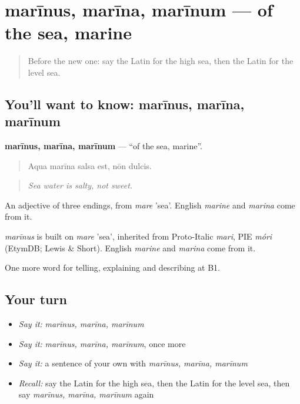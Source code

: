 \section[marīnus, marīna, marīnum]{marīnus, marīna, marīnum — of the sea, marine}

\label{lesson:LA-C442-marinus}



\begin{quote}
Before the new one: say the Latin for the high sea, then the Latin for the level sea.
\end{quote}

\subsection*{You'll want to know: marīnus, marīna, marīnum}
\textbf{marīnus, marīna, marīnum} — \textquotedblleft{}of the sea, marine\textquotedblright{}.

\begin{quote}
Aqua marīna salsa est, nōn dulcis.
\end{quote}

\begin{quote}
\emph{Sea water is salty, not sweet.}
\end{quote}

An adjective of three endings, from \emph{mare} 'sea'. English \emph{marine} and \emph{marina} come from it.

\begin{cousinweb}
\emph{marīnus} is built on \emph{mare} 'sea', inherited from Proto-Italic \emph{mari}, PIE \emph{móri} (EtymDB; Lewis \& Short). English \emph{marine} and \emph{marina} come from it.
\end{cousinweb}

\begin{grammarlens}[title={What you've built}]
One more word for telling, explaining and describing at B1.
\end{grammarlens}

\subsection*{Your turn}
\begin{itemize}
\raggedright
  \item \emph{Say it:} \emph{marīnus, marīna, marīnum}
  \item \emph{Say it:} \emph{marīnus, marīna, marīnum}, once more
  \item \emph{Say it:} a sentence of your own with \emph{marīnus, marīna, marīnum}
  \item \emph{Recall:} say the Latin for the high sea, then the Latin for the level sea, then say \emph{marīnus, marīna, marīnum} again
\end{itemize}

